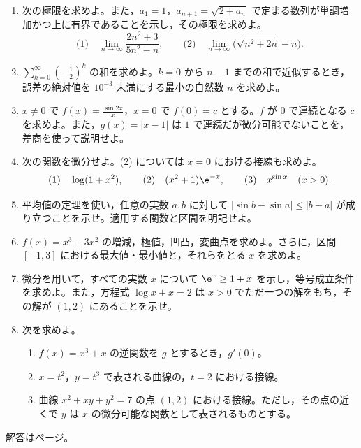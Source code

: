 \begin{enumerate}[label=\textbf{\thechapter.\arabic*},leftmargin=*]
 \item\label{問:極限と漸化式} 次の極限を求めよ。また，$a_1=1$，$a_{n+1}=\sqrt{2+a_n}$ で定まる数列が単調増加かつ上に有界であることを示し，その極限を求めよ。
 \[
  \text{(1)}\quad\lim_{n\to\infty}\frac{2n^2+3}{5n^2-n},
  \qquad
  \text{(2)}\quad\lim_{n\to\infty}\bigl(\sqrt{n^2+2n}-n\bigr).
 \]
 \item\label{問:等比誤差} $\sum_{k=0}^{\infty}\left(-\frac12\right)^k$ の和を求めよ。$k=0$ から $n-1$ までの和で近似するとき，誤差の絶対値を $10^{-3}$ 未満にする最小の自然数 $n$ を求めよ。
 \item\label{問:連続と微分可能} $x\ne0$ で $f(x)=\frac{\sin2x}{x}$，$x=0$ で $f(0)=c$ とする。$f$ が $0$ で連続となる $c$ を求めよ。また，$g(x)=|x-1|$ は $1$ で連続だが微分可能でないことを，差商を使って説明せよ。
 \item\label{問:微分計算} 次の関数を微分せよ。(2) については $x=0$ における接線も求めよ。
 \[
  \text{(1)}\quad\log(1+x^2),\qquad
  \text{(2)}\quad(x^2+1)\e^{-x},\qquad
  \text{(3)}\quad x^{\sin x}\quad(x>0).
 \]
 \item\label{問:平均値評価} 平均値の定理を使い，任意の実数 $a,b$ に対して $|\sin b-\sin a|\le|b-a|$ が成り立つことを示せ。適用する関数と区間を明記せよ。
 \item\label{問:三次関数グラフ} $f(x)=x^3-3x^2$ の増減，極値，凹凸，変曲点を求めよ。さらに，区間 $[-1,3]$ における最大値・最小値と，それらをとる $x$ を求めよ。
 \item\label{問:指数不等式方程式} 微分を用いて，すべての実数 $x$ について $\e^x\ge1+x$ を示し，等号成立条件を求めよ。また，方程式 $\log x+x=2$ は $x>0$ でただ一つの解をもち，その解が $(1,2)$ にあることを示せ。
 \item\label{問:逆媒介陰} 次を求めよ。
 \begin{enumerate}[label=(\arabic*),leftmargin=*]
  \item $f(x)=x^3+x$ の逆関数を $g$ とするとき，$g'(0)$。
  \item $x=t^2$，$y=t^3$ で表される曲線の，$t=2$ における接線。
  \item 曲線 $x^2+xy+y^2=7$ の点 $(1,2)$ における接線。ただし，その点の近くで $y$ は $x$ の微分可能な関数として表されるものとする。
 \end{enumerate}
\end{enumerate}

\smallskip\noindent 解答は\pageref{解答:第2章}ページ。

